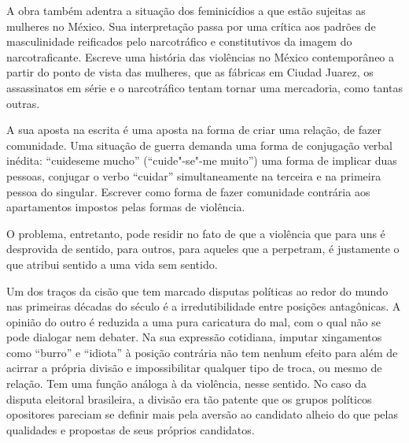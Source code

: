 A obra também adentra a situação dos feminicídios a que estão sujeitas as mulheres no México. Sua interpretação
passa por uma crítica aos padrões de masculinidade reificados pelo
narcotráfico e constitutivos da imagem do narcotraficante. Escreve uma
história das violências no México contemporâneo a partir do ponto de
vista das mulheres, que as fábricas em Ciudad Juarez, os assassinatos em série e o narcotráfico tentam tornar uma mercadoria, como tantas outras.

A sua aposta na escrita é uma aposta na forma de criar uma relação, de
fazer comunidade. Uma situação de guerra demanda uma forma de conjugação verbal inédita:
``cuideseme mucho'' (``cuide"-se"-me muito'') uma forma de implicar duas
pessoas, conjugar o verbo ``cuidar'' simultaneamente na terceira e na
primeira pessoa do singular. Escrever como forma de fazer comunidade
contrária aos apartamentos impostos pelas formas de violência. %


O problema, entretanto, pode residir no fato de que a violência que para
uns é desprovida de sentido, para outros, para aqueles que a perpetram,
é justamente o que atribui sentido a uma vida sem sentido.

\asterisc

Um dos traços da cisão que tem marcado disputas políticas ao redor do
mundo nas primeiras décadas do século  é a irredutibilidade entre
posições antagônicas. A opinião do outro é reduzida a uma pura
caricatura do mal, com o qual não se pode dialogar nem debater. Na sua
expressão cotidiana, imputar xingamentos como ``burro'' e ``idiota'' à
posição contrária não tem nenhum efeito para além de acirrar a própria
divisão e impossibilitar qualquer tipo de troca, ou mesmo de relação.
Tem uma função análoga à da violência, nesse sentido. No caso da disputa
eleitoral brasileira, a divisão era tão patente que os grupos políticos
opositores pareciam se definir mais pela aversão ao candidato alheio do
que pelas qualidades e propostas de seus próprios candidatos.

